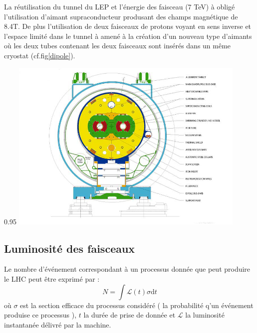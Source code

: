La réutilisation du tunnel du LEP et l'énergie des faisceau (7 TeV) à obligé l'utilisation d'aimant supraconducteur produsant des champs magnétique de 8.4T. De plus l'utilisation de deux faisceaux de protons voyant en sens inverse et l'espace limité dans le tunnel à amené à la création d'un nouveau type d'aimants où les deux tubes contenant les deux faisceaux sont insérés dans un même cryostat (cf.fig\ref{dipole}).

\begin{minipagewithmarginpars}[h]{0.95\textwidth}
\centering
\includegraphics[width=0.85\textwidth]{LHC/dipole.jpg}
\label{dipole}	
\end{minipagewithmarginpars}

\subsection{Luminosité des faisceaux}
Le nombre d'événement correspondant à un processus donnée que peut produire le LHC peut être exprimé par :
\begin{equation}
N=\int \mathcal{L}(t)\sigma \mathrm dt
\end{equation}
où $\sigma$ est la section efficace du processus considéré ( la probabilité q'un événement produise ce processus ), $t$ la durée de prise de donnée et $\mathcal{L}$ la luminosité instantanée délivré par la machine.

